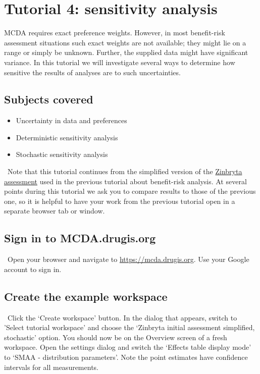 \documentclass[00_mcda_tutorial.tex]{subfiles}
\begin{document}
\section*{Tutorial 4: sensitivity analysis}
\addtocounter{section}{1}

MCDA requires exact preference weights. However, in most benefit-risk assessment situations such exact weights are not available; they might lie on a range or simply be unknown. Further, the supplied data might have significant variance. In this tutorial we will investigate several ways to determine how sensitive the results of analyses are to such uncertainties.

\subsection*{Subjects covered}
\begin{itemize}
\item Uncertainty in data and preferences
\item Deterministic sensitivity analysis
\item Stochastic sensitivity analysis
\end{itemize}

\noindent \faExclamationTriangle \, Note that this tutorial continues from the simplified version of the \href{https://www.ema.europa.eu/en/medicines/human/EPAR/zinbryta#authorisation-details-section}{Zinbryta assessment} used in the previous tutorial about benefit-risk analysis. At several points during this tutorial we ask you to compare results to those of the previous one, so it is helpful to have your work from the previous tutorial open in a separate browser tab or window.

\subsection*{Sign in to MCDA.drugis.org}
\leftpointright \, Open your browser and navigate to \href{https://mcda.drugis.org}{https://mcda.drugis.org}. Use your Google account to sign in.

\subsection*{Create the example workspace}
\leftpointright \, Click the ‘Create workspace’ button. In the dialog that appears, switch to 'Select tutorial workspace' and choose the ‘Zinbryta initial assessment simplified, stochastic’ option. You should now be on the Overview screen of a fresh workspace. Open the settings dialog and switch the ‘Effects table display mode’ to ‘SMAA - distribution parameters’. Note the point estimates have confidence intervals for all measurements.
\newline
\end{document}
